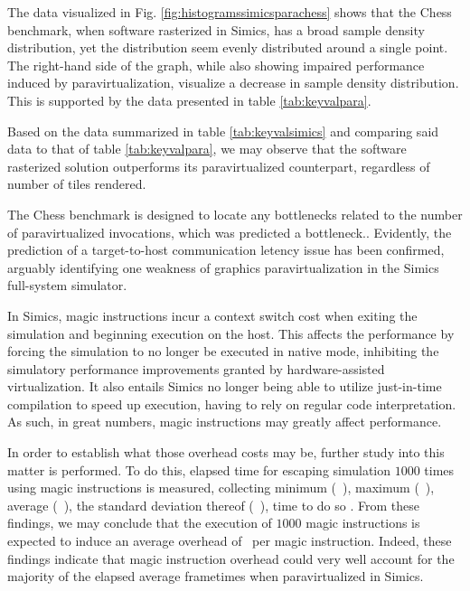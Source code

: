 The data visualized in Fig. \ref{fig:histogramssimicsparachess} shows that the Chess benchmark, when software rasterized in Simics, has a broad sample density distribution, yet the distribution seem evenly distributed around a single point.
The right-hand side of the graph, while also showing impaired performance induced by paravirtualization, visualize a decrease in sample density distribution.
This is supported by the data presented in table \ref{tab:keyvalpara}.

Based on the data summarized in table \ref{tab:keyvalsimics} and comparing said data to that of table \ref{tab:keyvalpara}, we may observe that the software rasterized solution outperforms its paravirtualized counterpart, regardless of number of tiles rendered.

The Chess benchmark is designed to locate any bottlenecks related to the number of paravirtualized invocations, which was predicted a bottleneck..
Evidently, the prediction of a target-to-host communication letency issue has been confirmed, arguably identifying one weakness of graphics paravirtualization in the Simics full-system simulator.

In Simics, magic instructions incur a context switch cost when exiting the simulation and beginning execution on the host.
This affects the performance by forcing the simulation to no longer be executed in native mode, inhibiting the simulatory performance improvements granted by hardware-assisted virtualization.
It also entails Simics no longer being able to utilize just-in-time compilation to speed up execution, having to rely on regular code interpretation.
As such, in great numbers, magic instructions may greatly affect performance.

In order to establish what those overhead costs may be, further study into this matter is performed.
To do this, elapsed time for escaping simulation $1000$ times using magic instructions is measured, collecting minimum (~\milli\second ), maximum (~\milli\second ), average (~\milli\second ), the standard deviation thereof (~\milli\second ), time to do so .
From these findings, we may conclude that the execution of $1000$ magic instructions is expected to induce an average overhead of ~\milli\second  per magic instruction.
Indeed, these findings indicate that magic instruction overhead could very well account for the majority of the elapsed average frametimes when paravirtualized in Simics.

